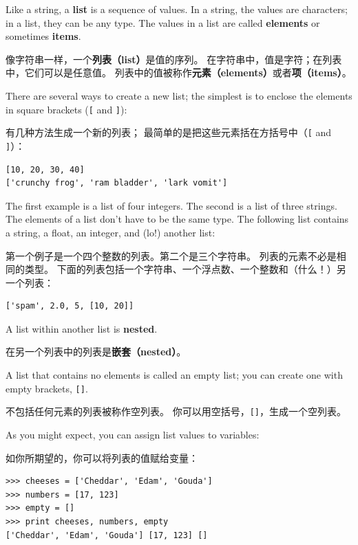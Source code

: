 \documentclass[10pt]{book}
\begin{document}
\begin{CJK}{UTF8}{gbsn}
Like a string, a {\bf list} is a sequence of values.  In a string, the
values are characters; in a list, they can be any type.  The values in
a list are called {\bf elements} or sometimes {\bf items}.

像字符串一样，一个{\bf 列表（list）}是值的序列。
在字符串中，值是字符；在列表中，它们可以是任意值。
列表中的值被称作{\bf 元素（elements）}或者{\bf 项（items）}。

There are several ways to create a new list; the simplest is to
enclose the elements in square brackets (\verb"[" and \verb"]"):

有几种方法生成一个新的列表；
最简单的是把这些元素括在方括号中（\verb"[" and \verb"]"）：

\begin{verbatim}
[10, 20, 30, 40]
['crunchy frog', 'ram bladder', 'lark vomit']
\end{verbatim}
%
The first example is a list of four integers.  The second is a list of
three strings.  The elements of a list don't have to be the same type.
The following list contains a string, a float, an integer, and
(lo!) another list:

第一个例子是一个四个整数的列表。第二个是三个字符串。
列表的元素不必是相同的类型。
下面的列表包括一个字符串、一个浮点数、一个整数和（什么！）另一个列表：

\begin{verbatim}
['spam', 2.0, 5, [10, 20]]
\end{verbatim}
%
A list within another list is {\bf nested}.

在另一个列表中的列表是{\bf 嵌套（nested）}。

A list that contains no elements is
called an empty list; you can create one with empty
brackets, \verb"[]".

不包括任何元素的列表被称作空列表。
你可以用空括号，\verb"[]"，生成一个空列表。

As you might expect, you can assign list values to variables:

如你所期望的，你可以将列表的值赋给变量：

\begin{verbatim}
>>> cheeses = ['Cheddar', 'Edam', 'Gouda']
>>> numbers = [17, 123]
>>> empty = []
>>> print cheeses, numbers, empty
['Cheddar', 'Edam', 'Gouda'] [17, 123] []
\end{verbatim}
%



\end{CJK}
\end{document}
